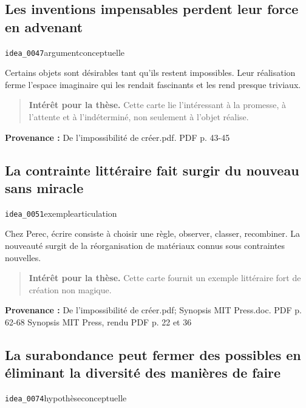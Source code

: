 \documentclass[10pt,a4paper]{article}
\begin{document}
\subsection{Les inventions impensables perdent leur force en advenant}
{\small\color{metadata} \texttt{idea\_0047}\quad\textbullet\quad argument\quad\textbullet\quad conceptuelle\par}

Certains objets sont désirables tant qu'ils restent impossibles. Leur réalisation ferme l'espace imaginaire qui les rendait fascinants et les rend presque triviaux.

\begin{quote}
\textbf{Intérêt pour la thèse.} Cette carte lie l'intéressant à la promesse, à l'attente et à l'indéterminé, non seulement à l'objet réalise.
\end{quote}
{\footnotesize\color{metadata}\textbf{Provenance :} De l'impossibilité de créer.pdf. PDF p. 43-45\par}

\subsection{La contrainte littéraire fait surgir du nouveau sans miracle}
{\small\color{metadata} \texttt{idea\_0051}\quad\textbullet\quad exemple\quad\textbullet\quad articulation\par}

Chez Perec, écrire consiste à choisir une règle, observer, classer, recombiner. La nouveauté surgit de la réorganisation de matériaux connus sous contraintes nouvelles.

\begin{quote}
\textbf{Intérêt pour la thèse.} Cette carte fournit un exemple littéraire fort de création non magique.
\end{quote}
{\footnotesize\color{metadata}\textbf{Provenance :} De l'impossibilité de créer.pdf; Synopsis MIT Press.doc. PDF p. 62-68 Synopsis MIT Press, rendu PDF p. 22 et 36\par}

\subsection{La surabondance peut fermer des possibles en éliminant la diversité des manières de faire}
{\small\color{metadata} \texttt{idea\_0074}\quad\textbullet\quad hypothèse\quad\textbullet\quad conceptuelle\par}
\end{document}
